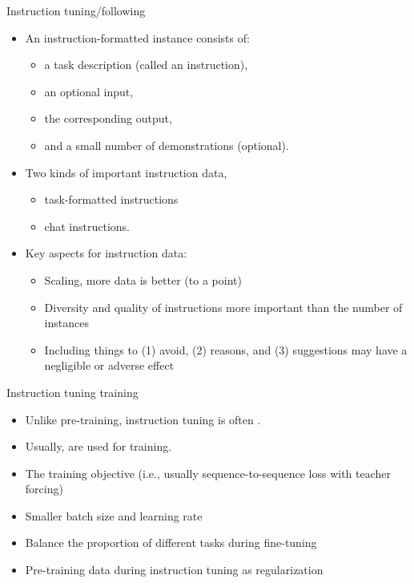 \documentclass[10pt]{beamer}
\begin{document}

\begin{frame}{Instruction tuning/following}

\begin{itemize}
\item An instruction-formatted instance consists of:
\begin{itemize}
\item a task description (called an instruction),
\item an optional input,
\item the corresponding output,
\item and a small number of demonstrations (optional).
\end{itemize}
\item Two kinds of important instruction data,
\begin{itemize}
\item task-formatted instructions
\item chat instructions.
\end{itemize}
\item Key aspects for instruction data:
\begin{itemize}
\item Scaling, more data is better (to a point) %
\item Diversity and quality of instructions more important than the number of instances
\item Including things to (1) avoid, (2) reasons, and (3) suggestions may have a negligible or adverse effect
\end{itemize}
\end{itemize}

\end{frame}

\begin{frame}{Instruction tuning training}

\begin{itemize}
\item Unlike pre-training, instruction tuning is often .
\item Usually,  are used for training.

\pause
\item The training objective (i.e., usually sequence-to-sequence loss with teacher forcing)
\pause
\item Smaller batch size and learning rate
\pause
\item Balance the proportion of different tasks during fine-tuning
\pause
\item Pre-training data during instruction tuning as regularization%
\end{itemize}

\end{frame}
\end{document}
